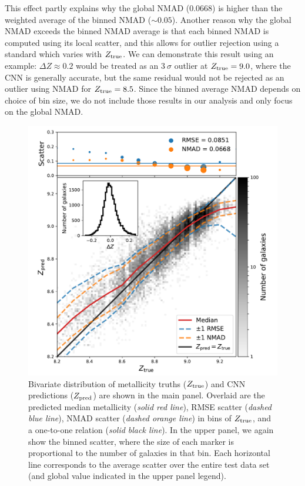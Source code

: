 \documentclass[fleqn,usenatbib]{mnras}
\begin{document}
This effect partly explains why the global NMAD (0.0668) is higher than the weighted average of the binned NMAD ($\sim 0.05$).
Another reason why the global NMAD exceeds the binned NMAD average is that each binned NMAD is computed using its local scatter, and this allows for outlier rejection using a standard which varies with $Z_{\rm true}$.
We can demonstrate this result using an example: $\Delta Z \approx 0.2$ would be treated as an $3~\sigma$ outlier at $Z_{\rm true} = 9.0$, where the CNN is generally accurate, but the same residual would not be rejected as an outlier using NMAD for $Z_{\rm true} = 8.5$.
Since the binned average NMAD depends on choice of bin size, we do not include those results in our analysis and only focus on the global NMAD.

\begin{figure}
	\includegraphics[width=\columnwidth]{02-prediction_summary.pdf}
	\caption{\label{fig:predicting-metallicity}
		Bivariate distribution of metallicity truths ($Z_{\rm true}$) and CNN predictions ($Z_{\rm pred}$) are shown in the main panel.
		Overlaid are the predicted median metallicity (\textit{solid red line}), RMSE scatter (\textit{dashed blue line}), NMAD scatter (\textit{dashed orange line}) in bins of $Z_{\rm true}$, and a one-to-one relation (\textit{solid black line}).
		In the upper panel, we again show the binned scatter, where the size of each marker is proportional to the number of galaxies in that bin.
		Each horizontal line corresponds to the average scatter over the entire test data set (and global value indicated in the upper panel legend).
		}
\end{figure}
\end{document}
